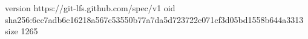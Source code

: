 version https://git-lfs.github.com/spec/v1
oid sha256:6cc7adb6c16218a567c53550b77a7da5d723722c071cf3d05bd1558b644a3313
size 1265
